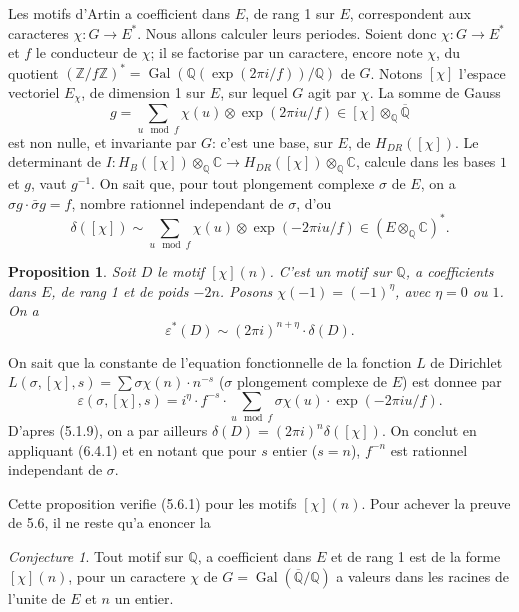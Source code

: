 \documentclass[12pt,a4paper]{article}
\theoremstyle{plain}
\newtheorem{proposition}[theorem]{Proposition}
\theoremstyle{definition}
\theoremstyle{remark}
\newtheorem{conjecture}[definition]{Conjecture}
\DeclareMathOperator{\Gal}{Gal}
\newcommand{\Q}{\mathbb{Q}}
\newcommand{\C}{\mathbb{C}}
\newcommand{\Z}{\mathbb{Z}}
\begin{document}
Les motifs d'Artin a coefficient dans $E$, de rang 1 sur $E$, correspondent aux
caracteres $\chi: G \to E^*$. Nous allons calculer leurs periodes. Soient donc
$\chi: G \to E^*$ et $f$ le conducteur de $\chi$; il se factorise par un caractere, encore note
$\chi$, du quotient $(\Z/f\Z)^* = \Gal(\Q(\exp(2\pi i/f))/\Q)$ de $G$. Notons $[\chi]$ l'espace
vectoriel $E_\chi$, de dimension 1 sur $E$, sur lequel $G$ agit par $\chi$. La somme de Gauss
\[
g = \sum_{u \mod f} \chi(u) \otimes \exp(2\pi i u/f) \in [\chi] \otimes_\Q \overline{\Q}
\]
est non nulle, et invariante par $G$: c'est une base, sur $E$, de $H_{DR}([\chi])$. Le
determinant de $I: H_B([\chi]) \otimes_\Q \C \to H_{DR}([\chi]) \otimes_\Q \C$, calcule dans les bases
$1$ et $g$, vaut $g^{-1}$. On sait que, pour tout plongement complexe $\sigma$ de $E$, on a
$\sigma g \cdot \bar{\sigma} g = f$, nombre rationnel independant de $\sigma$, d'ou
\begin{equation}\label{eq:6.4.1}
\delta([\chi]) \sim \sum_{u \mod f} \chi(u) \otimes \exp(-2\pi i u/f) \in (E \otimes_\Q \C)^*.
\end{equation}

\begin{proposition}\label{prop:6.5}
Soit $D$ le motif $[\chi](n)$. C'est un motif sur $\Q$, a coefficients dans $E$, de rang 1
et de poids $-2n$. Posons $\chi(-1) = (-1)^\eta$, avec $\eta = 0$ ou $1$. On a
\[
\varepsilon^*(D) \sim (2\pi i)^{n + \eta} \cdot \delta(D).
\]
\end{proposition}

On sait que la constante de l'equation fonctionnelle de la fonction $L$ de Dirichlet
$L(\sigma, [\chi], s) = \sum \sigma\chi(n) \cdot n^{-s}$ ($\sigma$ plongement complexe de $E$) est donnee par
\[
\varepsilon(\sigma, [\chi], s) = i^\eta \cdot f^{-s} \cdot \sum_{u \mod f} \sigma\chi(u) \cdot \exp(-2\pi i u/f).
\]
D'apres (5.1.9), on a par ailleurs $\delta(D) = (2\pi i)^n \delta([\chi])$. On conclut en appliquant
(6.4.1) et en notant que pour $s$ entier ($s = n$), $f^{-n}$ est rationnel independant de $\sigma$.

Cette proposition verifie (5.6.1) pour les motifs $[\chi](n)$. Pour achever la preuve de
5.6, il ne reste qu'a enoncer la

\begin{conjecture}\label{conj:6.6}
Tout motif sur $\Q$, a coefficient dans $E$ et de rang 1 est de la forme $[\chi](n)$, pour
un caractere $\chi$ de $G = \Gal(\overline{\Q}/\Q)$ a valeurs dans les racines de l'unite de $E$ et
$n$ un entier.
\end{conjecture}
\end{document}
